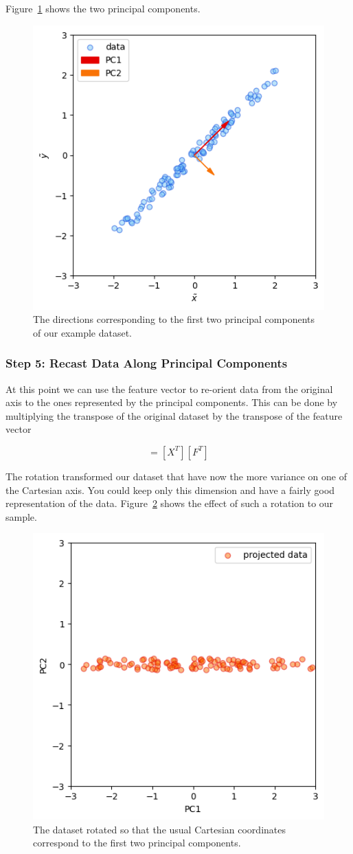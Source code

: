Figure~\ref{fig:pca_result} shows the two principal components.

\begin{figure}[hbt]
\centering
\includegraphics[width=0.5\linewidth]{figures/pca_pcs}
\caption{The directions corresponding to the first two principal components of our example dataset.}
\label{fig:pca_result}
\end{figure}

\subsubsection*{Step 5: Recast Data Along Principal Components}

At this point we can use the feature vector to re-orient data from the original axis to the ones represented by the principal components. 
This can be done by multiplying the transpose of the original dataset by the transpose of the feature vector

\begin{equation}
[Y] = [X^T][F^T]
\end{equation}

The rotation transformed our dataset that have now the more variance on one of the Cartesian axis. 
You could keep only this dimension and have a fairly good representation of the data. Figure~\ref{fig:pca_rotated} shows the effect of such a rotation to our sample.
\begin{figure}[hbtp]
\centering
\includegraphics[width=0.5\linewidth]{figures/pca_projected_data}
\caption{The dataset rotated so that the usual Cartesian coordinates correspond to the first two principal components.}
\label{fig:pca_rotated}
\end{figure}

